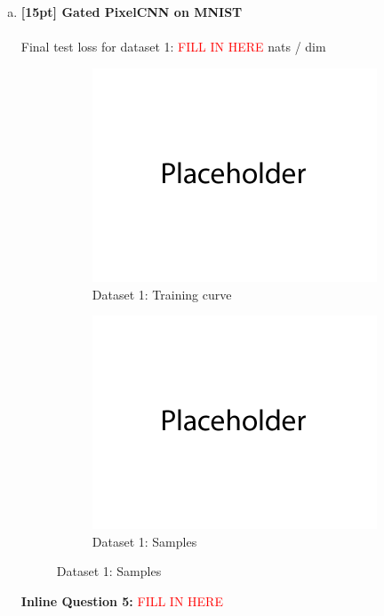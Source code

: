 \documentclass{article}
\begin{document}
\begin{enumerate}[(a)]
\item {\bf [15pt] Gated PixelCNN on MNIST} \\\\
Final test loss for dataset 1:  \textcolor{red}{FILL IN HERE}  nats / dim
\begin{figure}[H]
    \centering
    \begin{subfigure}{0.45\textwidth}
        \centering
        \includegraphics[width=\textwidth]{figures/placeholder.png}
        \caption{Dataset 1: Training curve}
    \end{subfigure}
    \hspace{0.2in}
    \begin{subfigure}{0.45\textwidth}
        \centering
        \includegraphics[width=\textwidth]{figures/placeholder.png}
        \caption{Dataset 1: Samples}
    \end{subfigure}
\end{figure}
\textbf{Inline Question 5:} \textcolor{red}{FILL IN HERE}


\end{enumerate}
\end{document}
